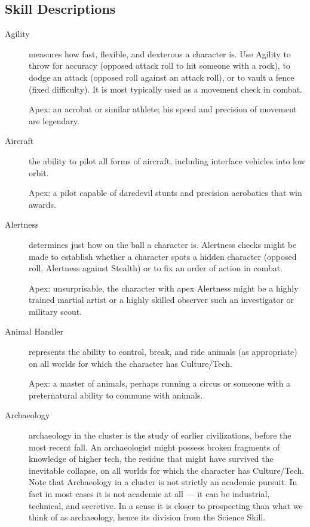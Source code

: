 \subsection{Skill Descriptions}

\begin{description}
\item[Agility]
measures how fast, flexible, and dexterous a character is. Use Agility to throw for accuracy (opposed attack roll to hit someone with a rock), to dodge an attack (opposed roll against an attack roll), or to vault a fence (fixed difficulty). It is most typically used as a movement check in combat.

Apex: an acrobat or similar athlete; his speed and precision of movement are legendary.

\item[Aircraft]
the ability to pilot all forms of aircraft, including interface vehicles into low orbit.

Apex: a pilot capable of daredevil stunts and precision aerobatics that win awards.

\item[Alertness]
determines just how on the ball a character is. Alertness checks might be made to establish whether a character spots a hidden character (opposed roll, Alertness against Stealth) or to fix an order of action in combat.

Apex: unsurprisable, the character with apex Alertness might be a highly trained martial artist or a highly skilled observer such an investigator or military scout.

\item[Animal Handler]
represents the ability to control, break, and ride animals (as appropriate) on all worlds for which the character has Culture/Tech.

Apex: a master of animals, perhaps running a circus or someone with a preternatural ability to commune with animals.

\item[Archaeology]
archaeology in the cluster is the study of earlier civilizations, before the most recent fall. An archaeologist might possess broken fragments of knowledge of higher tech, the residue that might have survived the inevitable collapse, on all worlds for which the character has Culture/Tech. Note that Archaeology in a cluster is not strictly an academic pursuit. In fact in most cases it is not academic at all --- it can be industrial, technical, and secretive. In a sense it is closer to prospecting than what we think of as archaeology, hence its division from the Science Skill.


\end{description}
